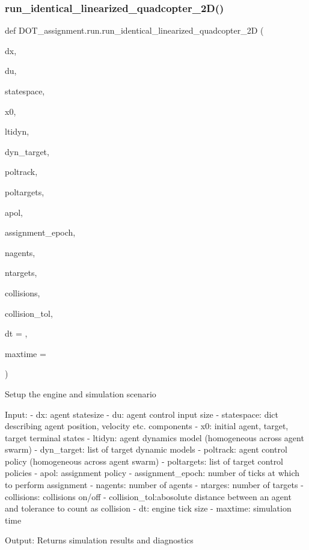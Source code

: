 \subsubsection{\texorpdfstring{run\_identical\_linearized\_quadcopter\_2D()}{run\_identical\_linearized\_quadcopter\_2D()}}
{\footnotesize\ttfamily def D\+O\+T\+\_\+assignment.\+run.\+run\+\_\+identical\+\_\+linearized\+\_\+quadcopter\+\_\+2D (\begin{DoxyParamCaption}\item[{}]{dx,  }\item[{}]{du,  }\item[{}]{statespace,  }\item[{}]{x0,  }\item[{}]{ltidyn,  }\item[{}]{dyn\+\_\+target,  }\item[{}]{poltrack,  }\item[{}]{poltargets,  }\item[{}]{apol,  }\item[{}]{assignment\+\_\+epoch,  }\item[{}]{nagents,  }\item[{}]{ntargets,  }\item[{}]{collisions,  }\item[{}]{collision\+\_\+tol,  }\item[{}]{dt = {},  }\item[{}]{maxtime = {} }\end{DoxyParamCaption})}

\begin{DoxyVerb}Setup the engine and simulation scenario

Input:
    - dx:           agent statesize
    - du:           agent control input size
    - statespace:   dict describing agent position, velocity etc. components
    - x0:           initial agent, target, target terminal states
    - ltidyn:       agent dynamics model (homogeneous across agent swarm)
    - dyn_target:   list of target dynamic models
    - poltrack:     agent control policy (homogeneous across agent swarm)
    - poltargets:   list of target control policies
    - apol:         assignment policy
    - assignment_epoch: number of ticks at which to perform assignment
    - nagents:      number of agents
    - ntarges:      number of targets
    - collisions:   collisions on/off
    - collision_tol:abosolute distance between an agent and tolerance to count as collision
    - dt:           engine tick size
    - maxtime:      simulation time

Output: Returns simulation results and diagnostics\end{DoxyVerb}
 \mbox{\label{namespace_d_o_t__assignment_1_1run_a85709b22a344bedd9fdb16351ec5187e}} 
